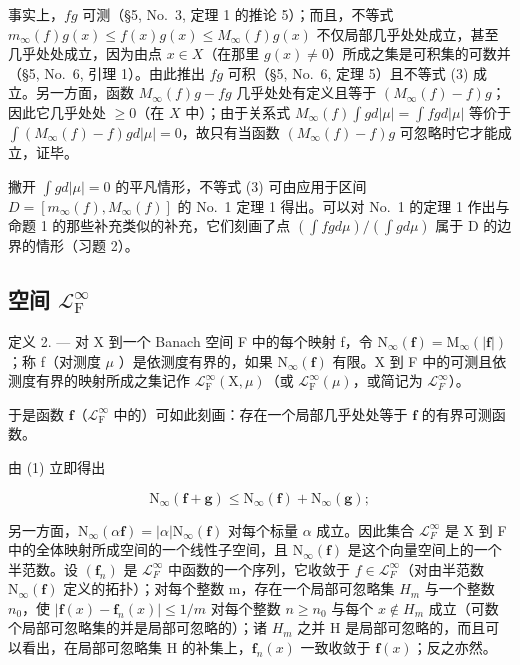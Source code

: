 事实上，\(fg\) 可测（§5, No.~3, 定理 1 的推论 5）；而且，不等式 \(m_{\infty}(f)g(x) \leqslant f(x)g(x) \leqslant M_{\infty}(f)g(x)\) 不仅局部几乎处处成立，甚至几乎处处成立，因为由点 \(x \in X\)（在那里 \(g(x) \neq 0\)）所成之集是可积集的可数并（§5, No.~6, 引理 1）。由此推出 \(fg\) 可积（§5, No.~6, 定理 5）且不等式 (3) 成立。另一方面，函数 \(M_{\infty}(f)g - fg\) 几乎处处有定义且等于 \((M_{\infty}(f) - f)g\)；因此它几乎处处 \(\geqslant 0\)（在 \(X\) 中）；由于关系式 \(M_{\infty}(f) \int g d|\mu| = \int fg d|\mu|\) 等价于 \(\int(M_{\infty}(f) - f)gd|\mu| = 0\)，故只有当函数 \((M_{\infty}(f) - f)g\) 可忽略时它才能成立，证毕。

撇开 \(\int g d|\mu| = 0\) 的平凡情形，不等式 (3) 可由应用于区间 \(D = [m_{\infty}(f), M_{\infty}(f)]\) 的 No.~1 定理 1 得出。可以对 No.~1 的定理 1 作出与命题 1 的那些补充类似的补充，它们刻画了点 \((\int f g d\mu)/(\int g d\mu)\) 属于 D 的边界的情形（习题 2）。

\subsection{\texorpdfstring{空间 \(\mathcal{L}_{\mathrm{F}}^{\infty}\)}{空间 L sub F to infinity}}

定义 2. --- 对 X 到一个 Banach 空间 F 中的每个映射 f，令 \(\mathrm{N}_{\infty}(\mathbf{f}) = \mathrm{M}_{\infty}(|\mathbf{f}|)\)；称 f（对测度 \(\mu\) ）是依测度有界的，如果 \(\mathrm{N}_{\infty}(\mathbf{f})\) 有限。X 到 F 中的可测且依测度有界的映射所成之集记作 \(\mathcal{L}_{\mathrm{F}}^{\infty}(\mathrm{X}, \mu)\)（或 \(\mathcal{L}_{\mathrm{F}}^{\infty}(\mu)\)，或简记为 \(\mathcal{L}_{F}^{\infty}\)）。

于是函数 \(\mathbf{f}\)（\(\mathcal{L}_{\mathrm{F}}^{\infty}\) 中的）可如此刻画：存在一个局部几乎处处等于 \(\mathbf{f}\) 的有界可测函数。

由 (1) 立即得出

\[
\mathrm{N} _ {\infty} (\mathbf {f} + \mathbf {g}) \leqslant \mathrm{N} _ {\infty} (\mathbf {f}) + \mathrm{N} _ {\infty} (\mathbf {g});
\]

另一方面，\(\mathrm{N}_{\infty}(\alpha\mathbf{f}) = |\alpha| \mathrm{N}_{\infty}(\mathbf{f})\) 对每个标量 \(\alpha\) 成立。因此集合 \(\mathcal{L}_{F}^{\infty}\) 是 X 到 F 中的全体映射所成空间的一个线性子空间，且 \(\mathrm{N}_{\infty}(\mathbf{f})\) 是这个向量空间上的一个半范数。设 \((\mathbf{f}_{n})\) 是 \(\mathcal{L}_{F}^{\infty}\) 中函数的一个序列，它收敛于 \(f \in \mathcal{L}_{F}^{\infty}\)（对由半范数 \(\mathrm{N}_{\infty}(\mathbf{f})\) 定义的拓扑）；对每个整数 m，存在一个局部可忽略集 \(H_{m}\) 与一个整数 \(n_{0}\)，使 \(|\mathbf{f}(x) - \mathbf{f}_{n}(x)| \leqslant 1/m\) 对每个整数 \(n \geqslant n_{0}\) 与每个 \(x \notin H_{m}\) 成立（可数个局部可忽略集的并是局部可忽略的）；诸 \(H_{m}\) 之并 H 是局部可忽略的，而且可以看出，在局部可忽略集 H 的补集上，\(\mathbf{f}_{n}(x)\) 一致收敛于 \(\mathbf{f}(x)\)；反之亦然。

